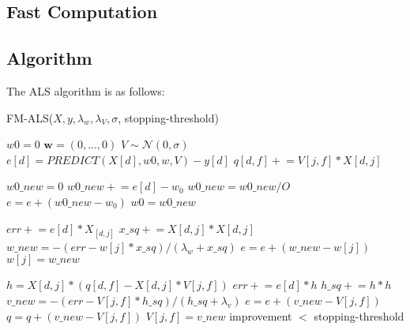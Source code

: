 \documentclass[10pt]{journal}
\newcommand{\pluseq}{\mathrel{+}=}
\begin{document}
\subsection{Fast Computation}


\subsection{Algorithm}

The ALS algorithm is as follows:

\begin{algorithm}
\caption{FM-ALS($X, y, \lambda_w, \lambda_V, \sigma$, stopping-threshold)}
  \begin{algorithmic}[1]
    \State $w0 = 0$  
    \State $\bm{w} = (0, ..., 0)$
    \State $V \sim \mathcal{N}(0, \sigma)$
      
        \State $e[d] = PREDICT(X[d], w0, w, V) - y[d]$
                \State $q[d, f] \pluseq V[j,f] * X[d,j]$
            \EndFor
        \EndFor
    \EndFor
    \item[]
    \Repeat  {}
        \State $w0\_new = 0$  
            \State $w0\_new \pluseq e[d] - w_0$
        \EndFor
        \State $w0\_new = w0\_new / O$
        \State $e = e + (w0\_new - w_0)$
        \State $w0 = w0\_new$
        \item[]
          
                \State $err \pluseq e[d] * X_[d,j]$
                \State $x\_sq \pluseq X[d,j] * X[d,j]$
            \EndFor
            \State $w\_new = - (err - w[j] * x\_sq) / (\lambda_w + x\_sq)$
            \State $e = e + (w\_new - w[j])$
            \State $w[j] = w\_new$
        \EndFor
        \item[]
          
                    \State $h = X[d,j] * (q[d,f] - X[d,j] * V[j,f])$
                    \State $err \pluseq e[d] * h$
                    \State $h\_sq \pluseq h * h$
                \EndFor
                \State $v\_new = - (err - V[j,f] * h\_sq) / (h\_sq + \lambda_v)$
                \State $e = e + (v\_new - V[j, f])$
                \State $q = q + (v\_new - V[j, f])$
                \State $V[j,f] = v\_new$
            \EndFor
        \EndFor
    \Until improvement $<$ stopping-threshold
  \end{algorithmic}
\end{algorithm}




\end{document}
